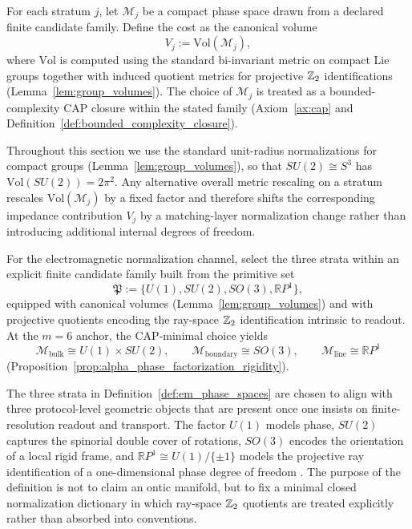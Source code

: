 \begin{definition}\label{def:impedance_volume}
For each stratum $j$, let $\mathcal{M}_j$ be a compact phase space drawn from a declared finite candidate family.
Define the cost as the canonical volume
\[
V_j:=\mathrm{Vol}(\mathcal{M}_j),
\]
where $\mathrm{Vol}$ is computed using the standard bi-invariant metric on compact Lie groups together with induced quotient metrics for projective $\mathbb{Z}_2$ identifications (Lemma~\ref{lem:group_volumes}).
The choice of $\mathcal{M}_j$ is treated as a bounded-complexity CAP closure within the stated family (Axiom~\ref{ax:cap} and Definition~\ref{def:bounded_complexity_closure}).
\end{definition}

\begin{remark}\label{rem:metric_normalization_volumes}
Throughout this section we use the standard unit-radius normalizations for compact groups (Lemma~\ref{lem:group_volumes}), so that $SU(2)\cong S^3$ has $\mathrm{Vol}(SU(2))=2\pi^2$.
Any alternative overall metric rescaling on a stratum rescales $\mathrm{Vol}(\mathcal{M}_j)$ by a fixed factor and therefore shifts the corresponding impedance contribution $V_j$ by a matching-layer normalization change rather than introducing additional internal degrees of freedom.
\end{remark}

\begin{definition}\label{def:em_phase_spaces}
For the electromagnetic normalization channel, select the three strata within an explicit finite candidate family built from the primitive set
\[
\mathfrak{P}:=\{U(1),SU(2),SO(3),\mathbb{R}P^1\},
\]
equipped with canonical volumes (Lemma~\ref{lem:group_volumes}) and with projective quotients encoding the ray-space $\mathbb{Z}_2$ identification intrinsic to readout.
At the $m=6$ anchor, the CAP-minimal choice yields
\[
\mathcal{M}_{\mathrm{bulk}}\cong U(1)\times SU(2),\qquad
\mathcal{M}_{\mathrm{boundary}}\cong SO(3),\qquad
\mathcal{M}_{\mathrm{line}}\cong \mathbb{R}P^1
\]
(Proposition~\ref{prop:alpha_phase_factorization_rigidity}).
\end{definition}

\begin{remark}\label{rem:em_strata_meaning}
The three strata in Definition~\ref{def:em_phase_spaces} are chosen to align with three protocol-level geometric objects that are present once one insists on finite-resolution readout and transport.
The factor $U(1)$ models phase, $SU(2)$ captures the spinorial double cover of rotations, $SO(3)$ encodes the orientation of a local rigid frame, and $\mathbb{R}P^1\cong U(1)/\{\pm 1\}$ models the projective ray identification of a one-dimensional phase degree of freedom \cite{Nakahara2003,HallLieGroups2015}.
The purpose of the definition is not to claim an ontic manifold, but to fix a minimal closed normalization dictionary in which ray-space $\mathbb{Z}_2$ quotients are treated explicitly rather than absorbed into conventions.
\end{remark}

